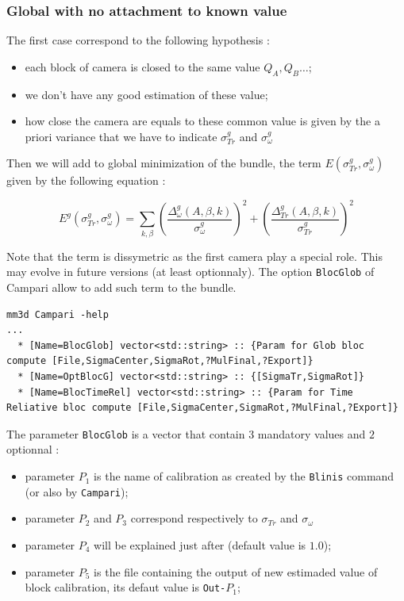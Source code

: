 \subsubsection{Global with no attachment to known value }

The first case correspond to the following hypothesis :

\begin{itemize}
    \item each block of camera is closed to the same value $Q_A, Q_B \dots $;
    \item we don't have any good estimation of these value;
    \item how close the camera are equals to these common value is given by the a priori
          variance that we have to indicate  $\sigma^g_{Tr} $ and $\sigma^g_{\omega} $
\end{itemize}

Then we will add to global minimization of the bundle, the term $E(\sigma^g_{Tr},\sigma^g_{\omega})$
given by the following equation :

\begin{equation}
      E^g(\sigma^g_{Tr},\sigma^g_{\omega}) =
      \sum _{k,\beta}
      (\frac{\Delta^g_{\omega}(A,\beta,k)}{\sigma^g_{\omega}}) ^2
      +(\frac{\Delta^g_{Tr}(A,\beta,k)}{\sigma^g_{Tr}})^2
\end{equation}

Note that the term is  dissymetric as the first camera play a special role. 
This may evolve in future versions (at least optionnaly).
The option  {\tt BlocGlob} of Campari allow to add such term to the bundle. 

\begin{verbatim}
mm3d Campari -help
...
  * [Name=BlocGlob] vector<std::string> :: {Param for Glob bloc compute [File,SigmaCenter,SigmaRot,?MulFinal,?Export]}
  * [Name=OptBlocG] vector<std::string> :: {[SigmaTr,SigmaRot]}
  * [Name=BlocTimeRel] vector<std::string> :: {Param for Time Reliative bloc compute [File,SigmaCenter,SigmaRot,?MulFinal,?Export]}

\end{verbatim}

The parameter {\tt BlocGlob} is a vector that  contain $3$ mandatory values  and $2$ optionnal :

\begin{itemize}
    \item parameter $P_1$ is the name of calibration as created by the {\tt Blinis} command (or also by 
          {\tt Campari});
    \item parameter $P_2$ and $P_3$ correspond respectively to  $\sigma_{Tr}$ and $\sigma_{\omega}$
    \item  parameter $P_4$ will be explained just after (default value is $1.0$);
    \item  parameter $P_5$ is the file containing the output of new estimaded value of block calibration,
           its defaut value is {\tt Out-}$P_1$;
\end{itemize}

